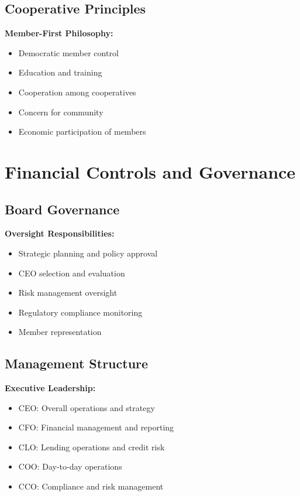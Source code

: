 \documentclass[11pt,letterpaper]{article}
\begin{document}
\subsection{Cooperative Principles}
\textbf{Member-First Philosophy:}
\begin{itemize}[leftmargin=*]
    \item Democratic member control
    \item Education and training
    \item Cooperation among cooperatives
    \item Concern for community
    \item Economic participation of members
\end{itemize}

\section{Financial Controls and Governance}

\subsection{Board Governance}
\textbf{Oversight Responsibilities:}
\begin{itemize}[leftmargin=*]
    \item Strategic planning and policy approval
    \item CEO selection and evaluation
    \item Risk management oversight
    \item Regulatory compliance monitoring
    \item Member representation
\end{itemize}

\subsection{Management Structure}
\textbf{Executive Leadership:}
\begin{itemize}[leftmargin=*]
    \item CEO: Overall operations and strategy
    \item CFO: Financial management and reporting
    \item CLO: Lending operations and credit risk
    \item COO: Day-to-day operations
    \item CCO: Compliance and risk management
\end{itemize}
\end{document}
